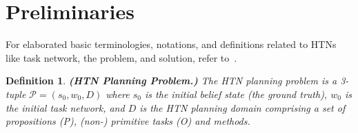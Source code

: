 \documentclass[letterpaper]{article} %
\newtheorem{definition}{Definition}
\begin{document}






\section{Preliminaries}
For elaborated basic terminologies, notations, and definitions related to HTNs like task network, the problem, and solution, refer to~\cite{naubooks0014222}.  
\begin{definition}
\textbf{(HTN Planning Problem.)} 
The HTN planning
problem is a 3-tuple $\mathcal{P} = (s_0, w_0, D)$ where $s_0$ is the initial belief state (the ground truth), $w_0$ is the initial task network, and $D$ is the HTN planning domain comprising a set of propositions (P), (non-) primitive tasks (O) and methods.
\end{definition}
\end{document}
